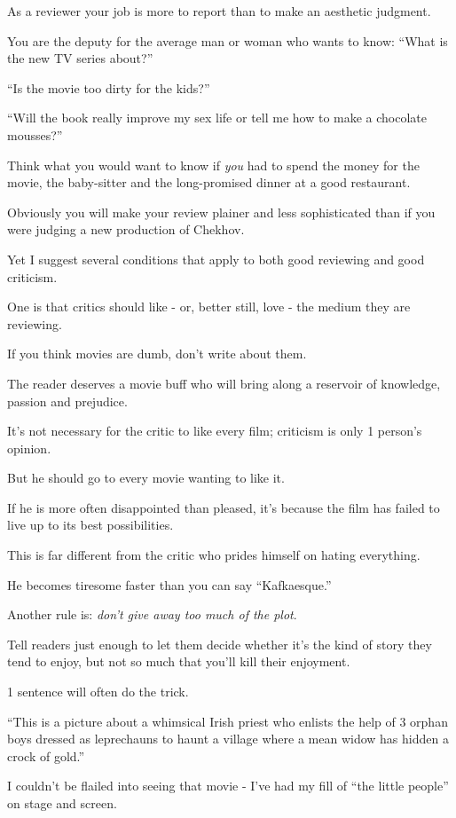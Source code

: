 \documentclass{book}
\numberwithin{equation}{section}
\begin{document}
As a reviewer your job is more to report than to make an aesthetic judgment.

You are the deputy for the average man or woman who wants to know: ``What is the new TV series about?''

``Is the movie too dirty for the kids?''

``Will the book really improve my sex life or tell me how to make a chocolate mousses?''

Think what you would want to know if \textit{you} had to spend the money for the movie, the baby-sitter and the long-promised dinner at a good restaurant.

Obviously you will make your review plainer and less sophisticated than if you were judging a new production of Chekhov.

%
Yet I suggest several conditions that apply to both good reviewing and good criticism.

%
One is that critics should like - or, better still, love - the medium they are reviewing.

If you think movies are dumb, don't write about them.

The reader deserves a movie buff who will bring along a reservoir of knowledge, passion and prejudice.

It's not necessary for the critic to like every film; criticism is only 1 person's opinion.

But he should go to every movie wanting to like it.

If he is more often disappointed than pleased, it's because the film has failed to live up to its best possibilities.

This is far different from the critic who prides himself on hating everything.

He becomes tiresome faster than you can say ``Kafkaesque.''

%
Another rule is: \textit{don't give away too much of the plot}.

Tell readers just enough to let them decide whether it's the kind of story they tend to enjoy, but not so much that you'll kill their enjoyment.

1 sentence will often do the trick.

``This is a picture about a whimsical Irish priest who enlists the help of 3 orphan boys dressed as leprechauns to haunt a village where a mean widow has hidden a crock of gold.''

I couldn't be flailed into seeing that movie - I've had my fill of ``the little people'' on stage and screen.
\end{document}
